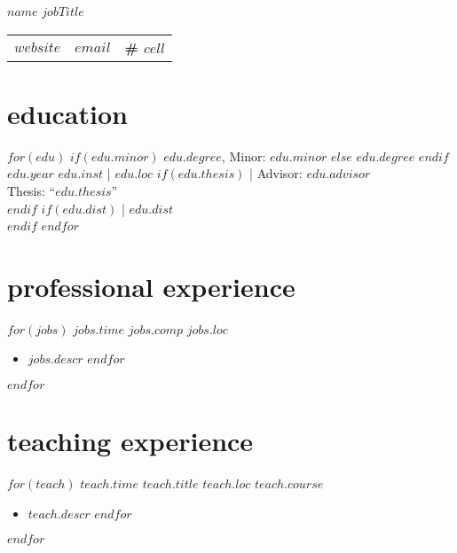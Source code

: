 \documentclass[]{friggeri-cv}
\begin{document}
\header
  {$name$}
  {$jobTitle$}



\vspace{-0.4in}
\hspace{0.35in}
\begin{tabular}{p{7.25cm}p{6cm}p{6cm}}
  \textbf{\href{$website$}{$website$}} &
  \textbf{\href{mailto:$email$}{$email$}} &
  \textbf{\# $cell$}
\end{tabular}



\vspace{-0.05in}

\section{education}
\begin{entrylist}
$for(edu)$
  \entrypub
  $if(edu.minor)$
    {$edu.degree$, Minor: $edu.minor$}
  $else$
    {$edu.degree$}
  $endif$
  {$edu.year$}
  {$edu.inst$ | $edu.loc$}
  $if(edu.thesis)$
    { | Advisor: $edu.advisor$}\\
    {Thesis: ``$edu.thesis$''}\\
  $endif$
  $if(edu.dist)$
    { | $edu.dist$}\\
  $endif$
$endfor$
\end{entrylist}



\vspace{-0.15in}
\section{professional experience}
\begin{entrylist}
$for(jobs)$
  \entryalt
  {$jobs.time$}
  {$jobs.comp$}
  {$jobs.loc$}
  \setlength\parskip{0pt}
  \begin{itemize}[noitemsep, leftmargin=0.2in]
    $for(jobs.descr)$
      \item $jobs.descr$
    $endfor$
  \end{itemize}
  \setlength\parskip{12pt}
$endfor$
\end{entrylist}



\vspace{-0.05in}
\section{teaching experience}
\begin{entrylist}
$for(teach)$
  \entry
  {$teach.time$}
  {$teach.title$}
  {$teach.loc$}
  {$teach.course$}
  \setlength\parskip{0pt}
  \begin{itemize}[noitemsep, leftmargin=0.2in]
    $for(teach.descr)$
      \item $teach.descr$
    $endfor$
  \end{itemize}
  \setlength\parskip{12pt}
$endfor$
\end{entrylist}
\end{document}
